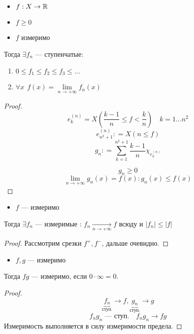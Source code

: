 

\cfoot{}



\begin{theorem}\itemfix
    \begin{itemize}
        \item \(f: X \to \mathbb{R}\)
        \item \(f \geq 0\)
        \item \(f\) измеримо
    \end{itemize}
    Тогда \(\exists f_n\) --- ступенчатые:
    \begin{enumerate}
        \item \(0 \leq f_1 \leq f_2 \leq f_3 \leq \dots \)
        \item \(\forall x \ \ f(x) = \lim\limits_{n \to +\infty} f_n(x)\)
    \end{enumerate}
\end{theorem}

\begin{proof}
    \[e^{(n)}_k = X\left( \frac{k - 1}{n} \leq f < \frac{k}{n} \right) \quad k = 1 \dots n^2\]
    \[e^{(n)}_{n^2 + 1} : = X(n \leq f)\]
    \[g_n: = \sum_{k = 1}^{n^2 + 1} \frac{k - 1}{n} \chi_{e_k^{(n)}}\]

    \begin{figure}[h]
        \centering
        
    \end{figure}

    \[g_n \geq 0\]
    \[\lim\limits_{n \to +\infty} g_n(x) = f(x) : g_n(x) \leq f(x)\]

\end{proof}

\begin{corollary}\itemfix
    \begin{itemize}
        \item \(f\) --- измеримо
    \end{itemize}
    Тогда \(\exists f_n\) --- измеримые : \(f_n \xrightarrow[n \to +\infty]{} f\) всюду и \(|f_n| \leq |f|\)
\end{corollary}
\begin{proof}
    Рассмотрим срезки \(f^{+}, f^{-}\), дальше очевидно.
\end{proof}

\begin{corollary}\itemfix
    \begin{itemize}
        \item \(f, g\) --- измеримо
    \end{itemize}
    Тогда \(fg\) --- измеримо, если \(0\cdot \infty = 0\).
\end{corollary}
\begin{proof}
    \[\underbrace{f_n}_{\text{ступ.}} \to f, \underbrace{g_n}_{\text{ступ.}} \to g\]
    \[f_n g_n \text{ --- ступ.} \quad f_n g_n \to fg\]
    Измеримость выполняется в силу измеримости предела.
\end{proof}

